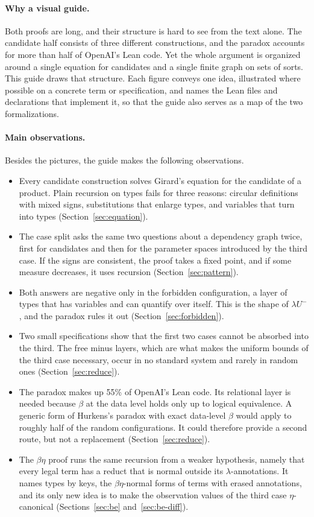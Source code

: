 \documentclass[10pt]{article}
\begin{document}
\paragraph{Why a visual guide.} Both proofs are long, and their structure is hard
to see from the text alone. The candidate half consists of three different
constructions, and the paradox accounts for more than half of OpenAI's Lean code.
Yet the whole argument is organized around a single equation for candidates and a
single finite graph on sets of sorts. This guide draws that structure. Each figure
conveys one idea, illustrated where possible on a concrete term or specification,
and names the Lean files and declarations that implement it, so that the guide also
serves as a map of the two formalizations.

\paragraph{Main observations.} Besides the pictures, the guide makes the following
observations.
\begin{itemize}
\item Every candidate construction solves Girard's equation for the candidate of a
  product. Plain recursion on types fails for three reasons: circular definitions
  with mixed signs, substitutions that enlarge types, and variables that turn into
  types (Section~\ref{sec:equation}).
\item The case split asks the same two questions about a dependency graph twice,
  first for candidates and then for the parameter spaces introduced by the third
  case. If the signs are consistent, the proof takes a fixed point, and if some
  measure decreases, it uses recursion (Section~\ref{sec:pattern}).
\item Both answers are negative only in the forbidden configuration, a layer of
  types that has variables and can quantify over itself. This is the shape of
  $\lambda U^-$, and the paradox rules it out (Section~\ref{sec:forbidden}).
\item Two small specifications show that the first two cases cannot be absorbed into
  the third. The free minus layers, which are what makes the uniform bounds of the
  third case necessary, occur in no standard system and rarely in random ones
  (Section~\ref{sec:reduce}).
\item The paradox makes up 55\% of OpenAI's Lean code. Its relational layer is
  needed because $\beta$ at the data level holds only up to logical equivalence. A
  generic form of Hurkens's paradox with exact data-level $\beta$ would apply to
  roughly half of the random configurations. It could therefore provide a second
  route, but not a replacement (Section~\ref{sec:reduce}).
\item The $\beta\eta$ proof runs the same recursion from a weaker hypothesis, namely
  that every legal term has a reduct that is normal outside its
  $\lambda$-annotations. It names types by keys, the $\beta\eta$-normal forms of
  terms with erased annotations, and its only new idea is to make the observation
  values of the third case $\eta$-canonical (Sections~\ref{sec:be}
  and~\ref{sec:be-diff}).
\end{itemize}
\end{document}
